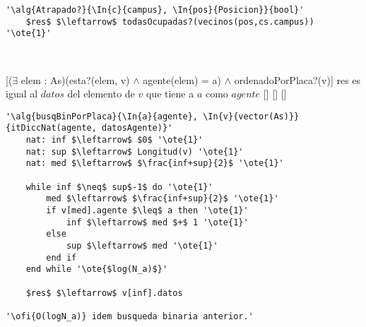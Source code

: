 \begin{lstlisting}[mathescape]
'\alg{Atrapado?}{\In{c}{campus}, \In{pos}{Posicion}}{bool}'
	$res$ $\leftarrow$ todasOcupadas?(vecinos(pos,cs.campus)) '\ote{1}'
\end{lstlisting}

~


[($\exists$ elem : As)(esta?(elem, v) $\land$ agente(elem) = a) $\land$ ordenadoPorPlaca?(v)]
{res es igual al $datos$ del elemento de $v$ que tiene a $a$ como $agente$}
[]
[]
[]

\begin{lstlisting}[mathescape]
'\alg{busqBinPorPlaca}{\In{a}{agente}, \In{v}{vector(As)}}{itDiccNat(agente, datosAgente)}'
	nat: inf $\leftarrow$ $0$ '\ote{1}'
	nat: sup $\leftarrow$ Longitud(v) '\ote{1}'
	nat: med $\leftarrow$ $\frac{inf+sup}{2}$ '\ote{1}'

	while inf $\neq$ sup$-1$ do '\ote{1}'
		med $\leftarrow$ $\frac{inf+sup}{2}$ '\ote{1}'
		if v[med].agente $\leq$ a then '\ote{1}'
			inf $\leftarrow$ med $+$ 1 '\ote{1}'
		else
			sup $\leftarrow$ med '\ote{1}'
		end if
	end while '\ote{$log(N_a)$}'

	$res$ $\leftarrow$ v[inf].datos

'\ofi{O(logN_a)} idem busqueda binaria anterior.'
\end{lstlisting}
